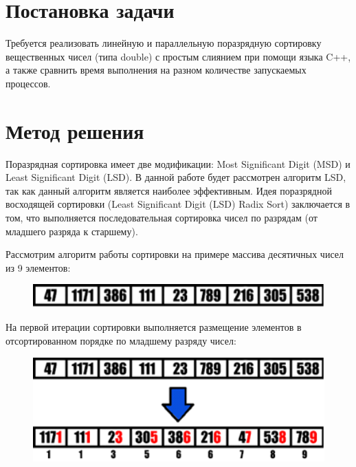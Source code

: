 \documentclass{report}
\begin{document}
\setcounter{page}{2}

\tableofcontents
\newpage

\section*{Постановка задачи}
Требуется реализовать линейную и параллельную поразрядную сортировку вещественных чисел (типа double) с простым слиянием при помощи языка C++, а также сравнить время выполнения на разном количестве запускаемых процессов.
\newpage

\section*{Метод решения}
Поразрядная сортировка имеет две модификации: Most Significant Digit (MSD) и Least Significant Digit (LSD). В данной работе будет рассмотрен алгоритм LSD, так как данный алгоритм является наиболее эффективным. Идея поразрядной восходящей сортировки (Least Significant Digit (LSD) Radix Sort) заключается в том, что выполняется последовательная сортировка чисел по разрядам (от младшего разряда к старшему). 

Рассмотрим алгоритм работы сортировки на примере массива десятичных чисел из 9 элементов:

\begin{figure}[htp]
    \centering
    \includegraphics[width=14cm]{images/image1.png}
    \label{fig:galaxy}
\end{figure}

На первой итерации сортировки выполняется размещение элементов в отсортированном порядке по младшему разряду чисел:

\begin{figure}[htp]
    \centering
    \includegraphics[width=14cm]{images/image2.png}
    \label{fig:galaxy}
\end{figure}
\end{document}
